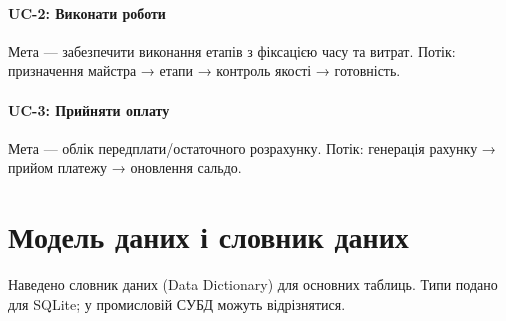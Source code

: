 \documentclass[14pt,a4paper]{extarticle}
\begin{document}
\paragraph{UC-2: Виконати роботи} Мета — забезпечити виконання етапів з фіксацією часу та витрат. Потік: призначення майстра → етапи → контроль якості → готовність.

\paragraph{UC-3: Прийняти оплату} Мета — облік передплати/остаточного розрахунку. Потік: генерація рахунку → прийом платежу → оновлення сальдо.

\clearpage

\section{Модель даних і словник даних}
Наведено словник даних (Data Dictionary) для основних таблиць. Типи подано для SQLite; у промисловій СУБД можуть відрізнятися.
\end{document}
